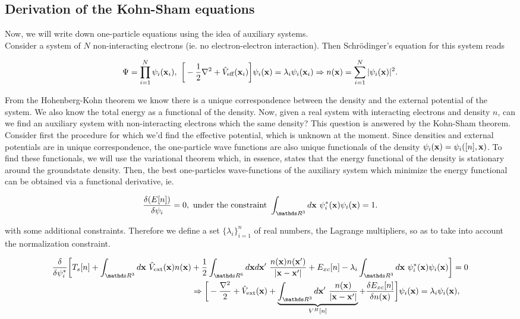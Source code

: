 \documentclass{homework}
\begin{document}
\subsection{Derivation of the Kohn-Sham equations}

Now, we will write down one-particle equations using the idea of auxiliary systems. \\

Consider a system of $N$ non-interacting electrons (ie. no electron-electron interaction). Then Schr\"odinger's equation for this system reads

$$
\Psi = \prod_{i=1}^{N} \psi_{i}({\bf x}_i), \textnormal{ } \bigg[-\frac{1}{2} \nabla^2 + \hat{V}_{\textnormal{eff}}({\bf x}_i) \bigg] \psi_{i} ({\bf x}) = \lambda_i \psi_{i}({\bf x}_i) \Rightarrow n({\bf x}) = \sum_{i=1}^{N} |\psi_i({\bf x})|^2.
$$

From the Hohenberg-Kohn theorem we know there is a unique correspondence between the density and the external potential of the system. We also know the total energy as a functional of the density. Now, given a real system with interacting electrons and density $n$, can we find an auxiliary system with non-interacting electrons which the same density? This question is answered by the Kohn-Sham theorem. \\

Consider first the procedure for which we'd find the effective potential, which is unknown at the moment. 
Since densities and external potentials are in unique correspondence, the one-particle wave functions are also unique functionals of the density $\psi_i ({\bf x}) = \psi_i ([n], {\bf x})$. To find these functionals, we will use the variational theorem which, in essence, states that the energy functional of the density is stationary around the groundstate density. Then, the best one-particles wave-functions of the auxiliary system which minimize the energy functional can be obtained via a functional derivative, ie.

$$
\frac{\delta(E[n])}{\delta \psi_i} = 0, \textnormal{ under the constraint } \int_{\R^3} d\x \blanky \psi_{i}^{*}(\x) \psi_i(\x) = 1.
$$

with some additional constraints. Therefore we define a set $\{\lambda_i\}_{i=1}^{n}$ of real numbers, the Lagrange multipliers, so as to take into account the normalization constraint. 

\begin{align}
    \frac{\delta}{\delta \psi_{i}^{*}} \bigg[T_s[n] + \int_{\R^3} d{\bf x} \blanky \hat{V}_{\textnormal{ext}}({\bf x}) n({\bf x}) &+ \frac{1}{2} \int_{\R^6} d{\bf x} d{\bf x'} \blanky \frac{n({\bf x})n({\bf x'})}{|{\bf x}-{\bf x'}|} + E_{xc}[n] - \lambda_i \int_{\R^3} d\x \blanky \psi_{i}^{*}(\x) \psi_i(\x)\bigg] = 0 \\
&\Rightarrow \bigg[-\frac{\nabla^2}{2} + \hat{V}_{\textnormal{ext}}({\bf x}) + \underbrace{\int_{\R^3}d\x' \blanky \frac{n({\bf x})}{|{\bf x}-{\bf x'}|}}_{V^H[n]} + \frac{\delta E_{xc}[n]}{\delta n(\x)}\bigg] \psi_i(\x) = \lambda_i \psi_i(\x),
\label{Kohn-Sham equations}
\end{align}
\end{document}
